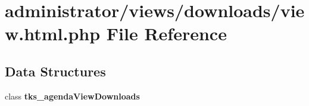 \section{administrator/views/downloads/view.html.\+php File Reference}
\label{administrator_2views_2downloads_2view_8html_8php}
\subsection*{Data Structures}
\begin{DoxyCompactItemize}
\item 
class \textbf{ tks\+\_\+agenda\+View\+Downloads}
\end{DoxyCompactItemize}
